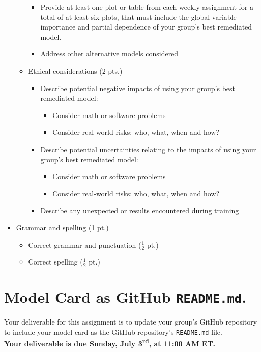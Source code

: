 \documentclass[fleqn]{article}
\begin{document}
\begin{itemize}
\begin{itemize}
\begin{itemize}
			\item Provide at least one plot or table from each weekly assignment for a total of at least six plots, that must include the global variable importance and partial dependence of your group's best remediated model.
			\item Address other alternative models considered
		\end{itemize}
		\item Ethical considerations (2 pts.)
		\begin{itemize}
			\item Describe potential negative impacts of using your group's best remediated model: 
			\begin{itemize}
			\item Consider math or software problems
			\item Consider real-world risks: who, what, when and how?
			\end{itemize}
			\item Describe potential uncertainties relating to the impacts of using your group's best remediated model:
			\begin{itemize} 
				\item Consider math or software problems
				\item Consider real-world risks: who, what, when and how?
			\end{itemize}
			\item Describe any unexpected or results encountered during training
		\end{itemize}
	\end{itemize}
	\item Grammar and spelling (1 pt.)
	\begin{itemize} 
		\item Correct grammar and punctuation ($\frac{1}{2}$ pt.)
		\item Correct spelling ($\frac{1}{2}$ pt.)
	\end{itemize}
\end{itemize}


\section{Model Card as GitHub \texttt{README.md}.}

Your deliverable for this assignment is to update your group's GitHub repository to include your model card as the GitHub repository's \texttt{README.md} file.\\

\noindent \textbf{Your deliverable is due Sunday, July 3\textsuperscript{rd}, at 11:00 AM ET.}\\
\end{document}
